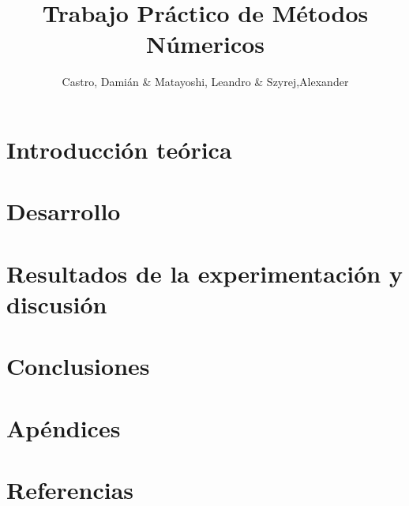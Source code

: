 \documentclass[a4paper,11pt]{article}
\title{Trabajo Práctico de Métodos Númericos}
\author{Castro, Dami\'an \& Matayoshi, Leandro \& Szyrej,Alexander}
\begin{document}


\newpage

\tableofcontents

\newpage

\section{Introducción teórica}

%

\section{Desarrollo}



\section{Resultados de la experimentación y discusión}



\section{Conclusiones}

%

\section{Apéndices}

%

\section{Referencias}

%
\end{document}
